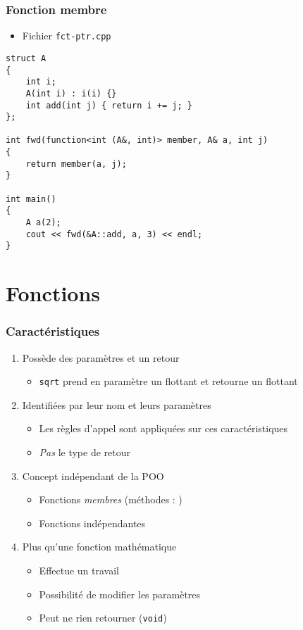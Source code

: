 \begin{frame}[containsverbatim]
\frametitle{Fonction membre}
\begin{itemize}
\item Fichier \texttt{fct-ptr.cpp}
\end{itemize}
\begin{lstlisting}
struct A
{
	int i;
	A(int i) : i(i) {}
	int add(int j) { return i += j; }
};

int fwd(function<int (A&, int)> member, A& a, int j)
{
	return member(a, j);
}

int main()
{	
	A a(2);
	cout << fwd(&A::add, a, 3) << endl;
}
\end{lstlisting}
\end{frame}

\section{Fonctions}

\begin{frame}
\frametitle{Caractéristiques}
\begin{enumerate}[<+->]
\item Possède des paramètres et un retour
	\begin{itemize}
	\item \texttt{sqrt} prend en paramètre un flottant et retourne un flottant
	\end{itemize}
\item Identifiées par leur nom et leurs paramètres
	\begin{itemize}
	\item Les règles d'appel sont appliquées sur ces caractéristiques
	\item \emph{Pas} le type de retour
	\end{itemize}
\item Concept indépendant de la POO
	\begin{itemize}
	\item Fonctions \emph{membres} (méthodes : \cpp)
	\item Fonctions indépendantes
	\end{itemize}
\item Plus qu'une fonction mathématique
	\begin{itemize}
	\item Effectue un travail
	\item Possibilité de modifier les paramètres
	\item Peut ne rien retourner (\lstinline|void|)
	\end{itemize}
\end{enumerate}
\end{frame}

